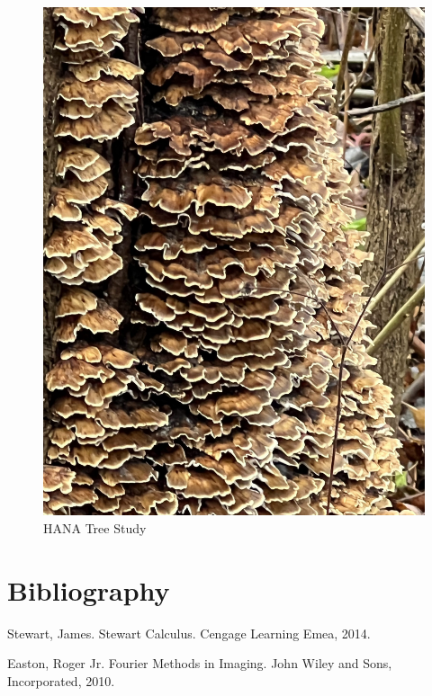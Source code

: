 \documentclass{article}
\begin{document}
\begin{figure}[h!]
\centering
\includegraphics[scale=.1]{Research/HANA/NOV2024/IMG_9860.JPG}
\caption{HANA Tree Study}
\label{fig:HANA}
\end{figure}


\clearpage
\section{Bibliography}
\begin{thebibliography}{}

Stewart, James. Stewart Calculus. Cengage Learning Emea, 2014.

Easton, Roger Jr. Fourier Methods in Imaging. John Wiley and Sons, Incorporated, 2010.


\end{thebibliography}
\end{document}
